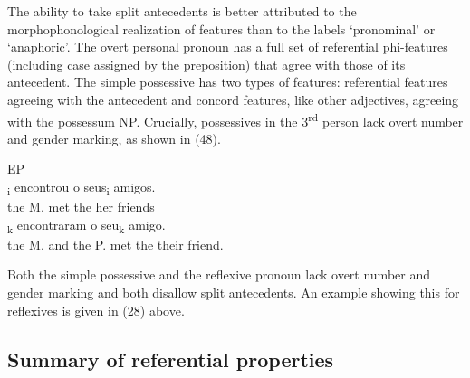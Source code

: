 \documentclass[output=paper]{langsci/langscibook}
\begin{document}
The ability to take split antecedents is better attributed to the morphophonological realization of features than to the labels ‘pronominal’ or ‘anaphoric’. The overt personal pronoun has a full set of referential phi-features (including case assigned by the preposition) that agree with those of its antecedent. The simple possessive has two types of features: referential features agreeing with the antecedent and concord features, like other adjectives, agreeing with the possessum NP. Crucially, possessives in the 3\textsuperscript{rd} person lack overt number and gender marking, as shown in (48).

\ea%
         EP\label{ex:wein:48}\\
    \ea  
    \gll \relax [A Maria]\textsubscript{i} encontrou o seus\textsubscript{i} amigos.\\
         the M. met the her friends\\
    \ex  
    \gll {}\textsubscript{k} encontraram o seu\textsubscript{k} amigo.\\
         the M. and the P. met the their friend.\\
    \z
\z

Both the simple possessive and the reflexive pronoun lack overt number and gender marking and both disallow split antecedents. An example showing this for reflexives is given in (28) above. 

\subsection{Summary of referential properties}%
\end{document}
